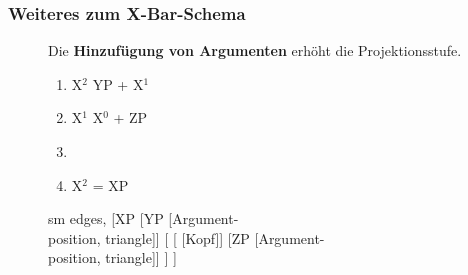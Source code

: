 \begin{frame}
\frametitle{Weiteres zum X-Bar-Schema}

\begin{figure}[b]

  	\begin{minipage}[b]{0.45\textwidth}
	Die \textbf{Hinzufügung von Argumenten} erhöht die Projektionsstufe.
	\begin{enumerate}
		\item X$^2$ \ras YP + X$^1$
		\item X$^1$ \ras X$^0$ + ZP
		\item[]
		\item X$^2$ = XP
	\end{enumerate}
	
  	\end{minipage}  
	\begin{minipage}[b]{0.45\textwidth}
	\centering
	\footnotesize{
		\begin{forest}
		sm edges,
		[\alert{XP} [YP [Argument-\\position, triangle]]
			[\alert{}
				[\alert{} [Kopf]]
				[ZP [Argument-\\position, triangle]]
			]
		]
		\end{forest}
		}
  	\end{minipage}  
\end{figure}

\end{frame}


